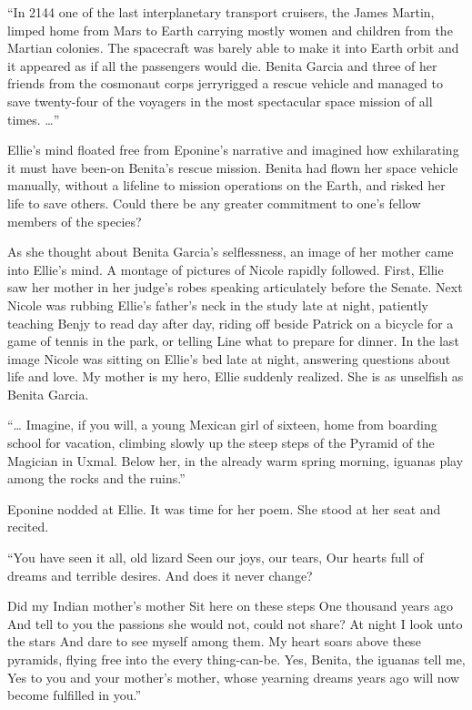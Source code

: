 \documentclass[]{article}
\begin{document}
{“In 2144 one of the last interplanetary transport cruisers, the James Martin, limped home from Mars to Earth carrying mostly women and children from the Martian colonies.  The spacecraft was barely able to make it into Earth orbit and it appeared as if all the passengers would die.  Benita Garcia and three of her friends from the cosmonaut corps jerryrigged a rescue vehicle and managed to save twenty-four of the voyagers in the most spectacular space mission of all times.  …”

Ellie’s mind floated free from Eponine’s narrative and imagined how exhilarating it must have been-on Benita’s rescue mission.  Benita had flown her space vehicle manually, without a lifeline to mission operations on the Earth, and risked her life to save others.  Could there be any greater commitment to one’s fellow members of the species?

As she thought about Benita Garcia’s selflessness, an image of her mother came into Ellie’s mind.  A montage of pictures of Nicole rapidly followed.  First, Ellie saw her mother in her judge’s robes speaking articulately before the Senate.  Next Nicole was rubbing Ellie’s father’s neck in the study late at night, patiently teaching Benjy to read day after day, riding off beside Patrick on a bicycle for a game of tennis in the park, or telling Line what to prepare for dinner.  In the last image Nicole was sitting on Ellie’s bed late at night, answering questions about life and love.  My mother is my hero, Ellie suddenly realized.  She is as unselfish as Benita Garcia.

“… Imagine, if you will, a young Mexican girl of sixteen, home from boarding school for vacation, climbing slowly up the steep steps of the Pyramid of the Magician in Uxmal.  Below her, in the already warm spring morning, iguanas play among the rocks and the ruins.”

Eponine nodded at Ellie.  It was time for her poem.  She stood at her seat and recited.

“You have seen it all, old lizard Seen our joys, our tears, Our hearts full of dreams and terrible desires.  And does it never change?

Did my Indian mother’s mother Sit here on these steps One thousand years ago And tell to you the passions she would not, could not share? At night I look unto the stars And dare to see myself among them.  My heart soars above these pyramids, flying free into the every thing-can-be.  Yes, Benita, the iguanas tell me, Yes to you and your mother’s mother, whose yearning dreams years ago will now become fulfilled in you.”

}
\end{document}
